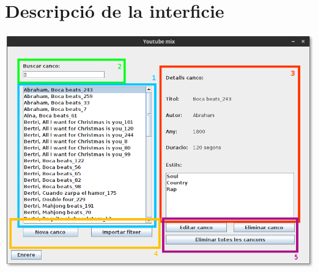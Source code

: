 \documentclass[a4paper,10pt,oneside]{sphinxmanual}
\begin{document}
\section{Descripció de la interficie}
\label{gest_cancons:descripcio-de-la-interficie}
\includegraphics{gest_canco.png}
\end{document}
